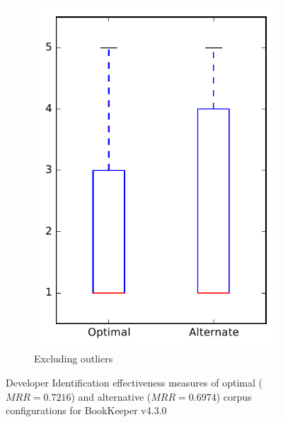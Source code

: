 \begin{figure}
\begin{subfigure}{.4\textwidth}
        \includegraphics[height=0.4\textheight]{figures/combo/dit_rq2_bookkeeper_no_outlier}
        \caption{Excluding outliers}\label{fig:combo:dit:rq2:bookkeeper_no_outlier}
    \end{subfigure}
\caption[Developer Identification effectiveness measures of optimal and alternative corpus configurations for BookKeeper v4.3.0]%
{Developer Identification effectiveness measures of optimal ($MRR=0.7216$) and alternative ($MRR=0.6974$) corpus configurations for BookKeeper v4.3.0}
\label{fig:combo:dit:rq2:bookkeeper}
\end{figure}
